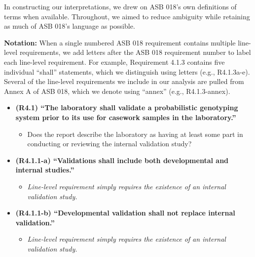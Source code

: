 In constructing our interpretations, we drew on ASB 018's own definitions of terms when available. Throughout, we aimed to reduce ambiguity while retaining as much of ASB 018's language as possible.


\textbf{Notation:} When a single numbered ASB 018 requirement contains multiple line-level requirements, we add letters after the ASB 018 requirement number to label each line-level requirement. For example, Requirement 4.1.3 contains five individual ``shall'' statements, which we distinguish using letters (e.g., R4.1.3a-e). Several of the line-level requirements we include in our analysis are pulled from Annex A of ASB 018, which we denote using ``annex'' (e.g., R4.1.3-annex).



\begin{itemize}
    \item \textbf{(R4.1) ``The laboratory shall validate a probabilistic genotyping system prior to its use for casework samples in the laboratory.''}~\cite[p.~3]{asb018} 
    \begin{itemize}
        \item Does the report describe the laboratory as having at least some part in conducting or reviewing the internal validation study?
    \end{itemize}
    
    \item \textbf{(R4.1.1-a) ``Validations shall include both developmental and internal studies.''}~\cite[p.~3]{asb018} 
    \begin{itemize}
        \item \textit{Line-level requirement simply requires the existence of an internal validation study.}
    \end{itemize}
    
    \item \textbf{(R4.1.1-b) ``Developmental validation shall not replace internal validation.''}~\cite[p.~3]{asb018}
    \begin{itemize}
        \item \textit{Line-level requirement simply requires the existence of an internal validation study.}
    \end{itemize}
    

\end{itemize}
